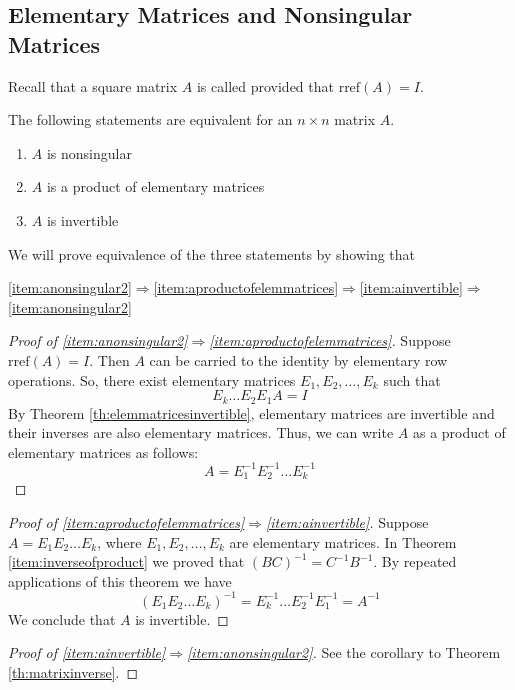 \documentclass{ximera}
\begin{document}
\subsection*{Elementary Matrices and Nonsingular Matrices} 

Recall that a square matrix $A$ is called  provided that $\mbox{rref}(A)=I$.

\begin{theorem}\label{th:elemmatrices}
The following statements are equivalent for an $n\times n$ matrix $A$.
\begin{enumerate}
\item\label{item:anonsingular2} $A$ is nonsingular
\item\label{item:aproductofelemmatrices} $A$ is a product of elementary matrices
\item\label{item:ainvertible} $A$ is invertible
\end{enumerate}
\end{theorem}
We will prove equivalence of the three statements by showing that
\begin{center}
\ref{item:anonsingular2}$\Rightarrow$\ref{item:aproductofelemmatrices}$\Rightarrow$\ref{item:ainvertible}$\Rightarrow$\ref{item:anonsingular2}
\end{center}
\begin{proof}[Proof of \ref{item:anonsingular2}$\Rightarrow$\ref{item:aproductofelemmatrices}]
Suppose $\mbox{rref}(A)=I$.  Then $A$ can be carried to the identity by elementary row operations.  So, there exist elementary matrices $E_1, E_2, \ldots ,E_k$ such that 
$$E_k\ldots E_2E_1A=I$$
By Theorem \ref{th:elemmatricesinvertible}, elementary matrices are invertible and their inverses are also elementary matrices.  Thus, we can write $A$ as a product of elementary matrices as follows:
$$A=E_1^{-1}E_2^{-1}\ldots E_k^{-1}$$
\end{proof}
\begin{proof}[Proof of \ref{item:aproductofelemmatrices}$\Rightarrow$\ref{item:ainvertible}]
Suppose $A=E_1E_2\ldots E_k$, where $E_1, E_2, \ldots , E_k$ are elementary matrices.  In Theorem \ref{item:inverseofproduct} we proved that $(BC)^{-1} = C^{-1} B^{-1}$.  By repeated applications of this theorem we have
$$(E_1E_2\ldots E_k)^{-1}=E_k^{-1}\ldots E_2^{-1}E_1^{-1}=A^{-1}$$
We conclude that $A$ is invertible.
\end{proof}
\begin{proof}[Proof of \ref{item:ainvertible}$\Rightarrow$\ref{item:anonsingular2}]
See the corollary to Theorem \ref{th:matrixinverse}.
\end{proof}
\end{document}

